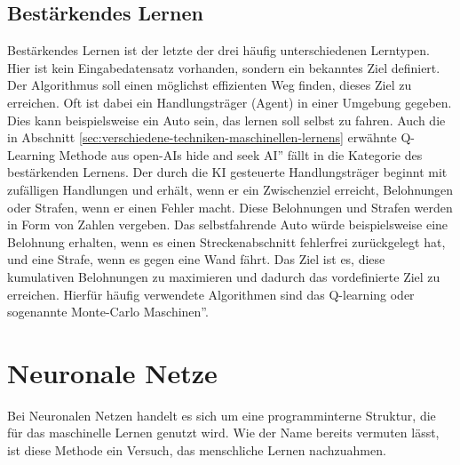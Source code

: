 \documentclass[11pt]{article}
\begin{document}
\subsection{Bestärkendes Lernen}
Bestärkendes Lernen ist der letzte der drei häufig unterschiedenen Lerntypen. Hier ist kein Eingabedatensatz vorhanden, sondern ein bekanntes Ziel definiert. Der Algorithmus soll einen möglichst effizienten Weg finden, dieses Ziel zu erreichen. Oft ist dabei ein Handlungsträger (Agent) in einer Umgebung gegeben. Dies kann beispielsweise ein Auto sein, das lernen soll selbst zu fahren. Auch die in Abschnitt  \ref{sec:verschiedene-techniken-maschinellen-lernens} erwähnte Q-Learning Methode aus open-AIs \glqq hide and seek AI'' fällt in die Kategorie des bestärkenden Lernens. Der durch die KI gesteuerte Handlungsträger beginnt mit zufälligen Handlungen und erhält, wenn er ein Zwischenziel erreicht, Belohnungen oder Strafen, wenn er einen Fehler macht. Diese Belohnungen und Strafen werden in Form von Zahlen vergeben. Das selbstfahrende Auto würde beispielsweise eine Belohnung erhalten, wenn es einen Streckenabschnitt fehlerfrei zurückgelegt hat, und eine Strafe, wenn es gegen eine Wand fährt. Das Ziel ist es, diese kumulativen Belohnungen zu maximieren und dadurch das vordefinierte Ziel zu erreichen. Hierfür häufig verwendete Algorithmen sind das Q-learning oder sogenannte \glqq Monte-Carlo Maschinen''.
\section{Neuronale Netze}\label{sec:neuronale-netze}
Bei Neuronalen Netzen handelt es sich um eine programminterne Struktur, die für das maschinelle Lernen genutzt wird. Wie der Name bereits vermuten lässt, ist diese Methode ein Versuch, das menschliche Lernen nachzuahmen.
\end{document}
